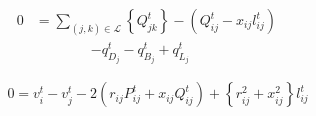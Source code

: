 \documentclass[../../outputs/main.tex]{subfiles}
\begin{document}
\vspace{-1.5em} %

\begin{align}
    {0} &= {\sum_{(j, k) \in \mathcal{L}} \left\{Q_{jk}^t\right\} 
        - \left(Q_{ij}^t - x_{ij}l_{ij}^t\right)} \nonumber && \\[-0.50em]
    {} & \qquad \qquad { - q_{D_j}^t - q_{B_j}^t + q^t_{L_j} }
    \label{eq:ReactivePowerBalanceNodej} &&
\end{align}

\vspace{-1.5em} %

\begin{equation}
    {0} = {v_{i}^t - v_j^t - 2(r_{ij}P_{ij}^t + x_{ij}Q_{ij}^t) + \left\{r_{ij}^2 + x_{ij}^2\right\}l_{ij}^t} \label{eq:KVL-branch-ij}
\end{equation}


\end{document}
